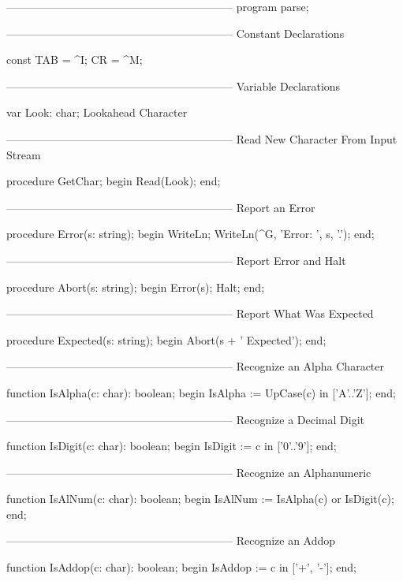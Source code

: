 \documentclass[float=false, crop=false]{standalone}
\begin{document}
\begin{code}
{--------------------------------------------------------------}
program parse;

{--------------------------------------------------------------}
{ Constant Declarations }

const TAB = ^I;
       CR = ^M;

{--------------------------------------------------------------}
{ Variable Declarations }

var Look: char;              { Lookahead Character }

{--------------------------------------------------------------}
{ Read New Character From Input Stream }

procedure GetChar;
begin
   Read(Look);
end;

{--------------------------------------------------------------}
{ Report an Error }

procedure Error(s: string);
begin
   WriteLn;
   WriteLn(^G, 'Error: ', s, '.');
end;


{--------------------------------------------------------------}
{ Report Error and Halt }

procedure Abort(s: string);
begin
   Error(s);
   Halt;
end;


{--------------------------------------------------------------}
{ Report What Was Expected }

procedure Expected(s: string);
begin
   Abort(s + ' Expected');
end;


{--------------------------------------------------------------}
{ Recognize an Alpha Character }

function IsAlpha(c: char): boolean;
begin
   IsAlpha := UpCase(c) in ['A'..'Z'];
end;


{--------------------------------------------------------------}
{ Recognize a Decimal Digit }

function IsDigit(c: char): boolean;
begin
   IsDigit := c in ['0'..'9'];
end;


{--------------------------------------------------------------}
{ Recognize an Alphanumeric }

function IsAlNum(c: char): boolean;
begin
   IsAlNum := IsAlpha(c) or IsDigit(c);
end;


{--------------------------------------------------------------}
{ Recognize an Addop }

function IsAddop(c: char): boolean;
begin
   IsAddop := c in ['+', '-'];
end;



\end{code}
\end{document}
